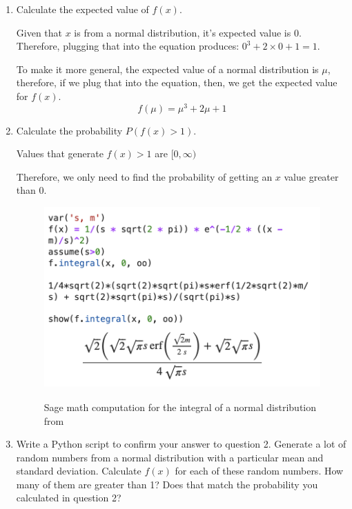 \documentclass{article}
\begin{document}
\begin{enumerate}
    \item Calculate the expected value of $f (x)$.

    Given that $x$ is from a normal distribution, it's expected value is $0$. Therefore, plugging that into the equation produces:
    $0^{3} + 2 \times 0 + 1 = 1$.

    To make it more general, the expected value of a normal distribution is $\mu$, therefore, if we plug that into the equation, then, we
    get the expected value for $f(x)$. 
    $$f(\mu) = \mu^{3} + 2 \mu + 1$$
    \item Calculate the probability $P ( f (x) > 1 )$.
    
    Values that generate $f(x) > 1$ are $[0, \infty)$

    \begin{center}
    \end{center}

    Therefore, we only need to find the probability of getting an $x$ value greater than $0$.

    \begin{figure}[H]
        \centering
        \includegraphics[width=300 pt]{problem.png}
        \label{fig:my_label}
        \caption{Sage math computation for the integral of a normal distribution from}
    \end{figure} 

    \item Write a Python script to confirm your answer to question 2. Generate a lot of random numbers from a normal distribution with a particular mean and standard deviation. Calculate $f (x)$ for each of these random numbers. How many of them are greater than 1? Does that match the probability you calculated in question 2?
    

\end{enumerate}
\end{document}
